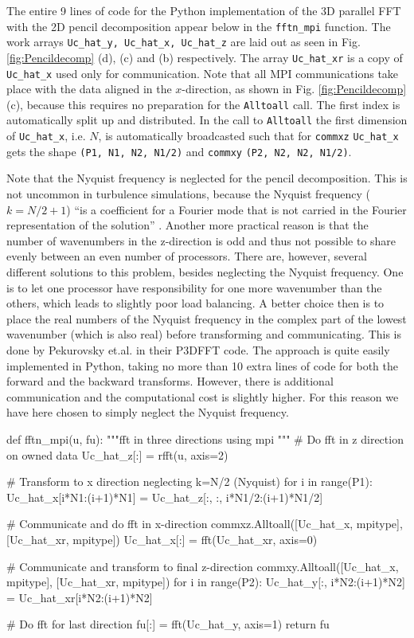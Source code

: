 \documentclass[11pt, oneside]{article}
\newcommand{\inpyth}{\lstinline[style=pythonstyle, basicstyle=\ttfamily]} %[]%
\begin{document}
The entire 9 lines of code for the Python implementation of the 3D parallel FFT with the 2D pencil decomposition appear below in the \inpyth{fftn_mpi} function. The work arrays \inpyth{Uc_hat_y, Uc_hat_x, Uc_hat_z} are laid out as seen in Fig. \ref{fig:Pencildecomp} (d), (c) and (b) respectively. The array \inpyth{Uc_hat_xr} is a copy of \inpyth{Uc_hat_x} used only for communication. Note that all MPI communications take place with the data aligned in the $x$-direction, as shown in Fig. \ref{fig:Pencildecomp} (c), because this requires no preparation for the \inpyth{Alltoall} call. The first index is automatically split up and distributed.  In the call to \inpyth{Alltoall} the first dimension of \inpyth{Uc_hat_x}, i.e. $N$, is automatically broadcasted such that for \inpyth{commxz} \inpyth{Uc_hat_x} gets the shape \inpyth{(P1, N1, N2, N1/2)} and \inpyth{commxy} \inpyth{(P2, N2, N2, N1/2)}.

Note that the Nyquist frequency is neglected for the pencil decomposition. This is not uncommon in turbulence simulations, because the Nyquist frequency ($k=N/2+1$) ``is a coefficient for a Fourier mode that is not carried in the Fourier representation of the solution'' \cite{Lee2013}.  Another more practical reason is that the number of wavenumbers in the z-direction is odd and thus not possible to share evenly between an even number of processors. There are, however, several different solutions to this problem, besides neglecting the Nyquist frequency. One is to let one processor have responsibility for one more wavenumber than the others, which leads to slightly poor load balancing. A better choice then is to place the real numbers of the Nyquist frequency in the complex part of the lowest wavenumber (which is also real) before transforming and communicating. This is done by Pekurovsky et.al. \cite{pekurovsky2012} in their P3DFFT code. The approach is quite easily implemented in Python, taking no more than 10 extra lines of code for both the forward and the backward transforms. However, there is additional communication and the computational cost is slightly higher. For this reason we have here chosen to simply neglect the Nyquist frequency.


\begin{python}
def fftn_mpi(u, fu):
    """fft in three directions using mpi
    """    
    # Do fft in z direction on owned data
    Uc_hat_z[:] = rfft(u, axis=2)
    
    # Transform to x direction neglecting k=N/2 (Nyquist)
    for i in range(P1):
        Uc_hat_x[i*N1:(i+1)*N1] = Uc_hat_z[:, :, i*N1/2:(i+1)*N1/2]
    
    # Communicate and do fft in x-direction
    commxz.Alltoall([Uc_hat_x, mpitype], [Uc_hat_xr, mpitype])
    Uc_hat_x[:] = fft(Uc_hat_xr, axis=0)        
    
    # Communicate and transform to final z-direction
    commxy.Alltoall([Uc_hat_x, mpitype], [Uc_hat_xr, mpitype])    
    for i in range(P2): 
        Uc_hat_y[:, i*N2:(i+1)*N2] = Uc_hat_xr[i*N2:(i+1)*N2]
                                   
    # Do fft for last direction 
    fu[:] = fft(Uc_hat_y, axis=1)
    return fu
\end{python}
\end{document}
